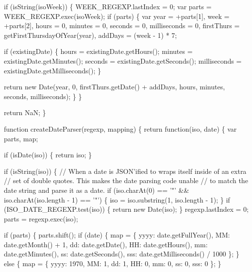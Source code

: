 \begin{DoxyCodeInclude}
{{{  \textcolor{keywordflow}{if} (isString(isoWeek)) \{
    WEEK\_REGEXP.lastIndex = 0;
    var parts = WEEK\_REGEXP.exec(isoWeek);
    \textcolor{keywordflow}{if} (parts) \{
      var year = +parts[1],
          week = +parts[2],
          hours = 0,
          minutes = 0,
          seconds = 0,
          milliseconds = 0,
          firstThurs = getFirstThursdayOfYear(year),
          addDays = (week - 1) * 7;

      \textcolor{keywordflow}{if} (existingDate) \{
        hours = existingDate.getHours();
        minutes = existingDate.getMinutes();
        seconds = existingDate.getSeconds();
        milliseconds = existingDate.getMilliseconds();
      \}

      \textcolor{keywordflow}{return} \textcolor{keyword}{new} Date(year, 0, firstThurs.getDate() + addDays, hours, minutes, seconds, milliseconds);
    \}
  \}

  \textcolor{keywordflow}{return} NaN;
\}

\textcolor{keyword}{function} createDateParser(regexp, mapping) \{
  \textcolor{keywordflow}{return} \textcolor{keyword}{function}(iso, date) \{
    var parts, map;

    \textcolor{keywordflow}{if} (isDate(iso)) \{
      \textcolor{keywordflow}{return} iso;
    \}

    \textcolor{keywordflow}{if} (isString(iso)) \{
      \textcolor{comment}{// When a date is JSON'ified to wraps itself inside of an extra}
      \textcolor{comment}{// set of double quotes. This makes the date parsing code unable}
      \textcolor{comment}{// to match the date string and parse it as a date.}
      \textcolor{keywordflow}{if} (iso.charAt(0) == \textcolor{charliteral}{'"'} && iso.charAt(iso.length - 1) == \textcolor{charliteral}{'"'}) \{
        iso = iso.substring(1, iso.length - 1);
      \}
      \textcolor{keywordflow}{if} (ISO\_DATE\_REGEXP.test(iso)) \{
        \textcolor{keywordflow}{return} \textcolor{keyword}{new} Date(iso);
      \}
      regexp.lastIndex = 0;
      parts = regexp.exec(iso);

      \textcolor{keywordflow}{if} (parts) \{
        parts.shift();
        \textcolor{keywordflow}{if} (date) \{
          map = \{
            yyyy: date.getFullYear(),
            MM: date.getMonth() + 1,
            dd: date.getDate(),
            HH: date.getHours(),
            mm: date.getMinutes(),
            ss: date.getSeconds(),
            sss: date.getMilliseconds() / 1000
          \};
        \} \textcolor{keywordflow}{else} \{
          map = \{ yyyy: 1970, MM: 1, dd: 1, HH: 0, mm: 0, ss: 0, sss: 0 \};
        \}

}}}
\end{DoxyCodeInclude}
